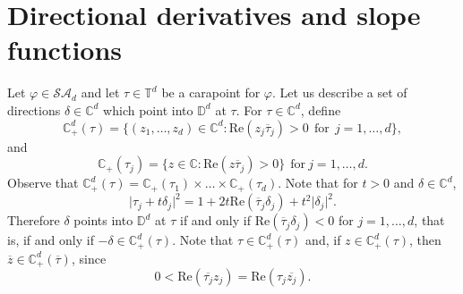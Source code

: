 \documentclass[11pt, reqno]{amsart}
\newcommand\1{\boldsymbol {1}}
\numberwithin{equation}{section}
\begin{document}
\section{Directional derivatives and slope functions}\label{directional_der}

Let $\varphi\in\mathcal{SA}_{d}$ and let $\tau\in\mathbb{T}^{d}$ be a carapoint for $\varphi$. Let us describe a set of directions $\delta\in\mathbb{C}^{d}$ which  point into $\mathbb{D}^{d}$ at $\tau$.
For $\tau\in\mathbb{C}^{d}$, define
$$\mathbb{C}_{+}^{d}(\tau) = \big\{( z_{1},\hdots, z_{d})\in\mathbb{C}^{d} : \mathrm{Re}( z_{j}\overline{\tau}_{j})>0~~\text{for}~~j=1,\hdots,d\big\},$$
and 
$$\mathbb{C}_{+}(\tau_{j}) = \big\{ z\in\mathbb{C} : \mathrm{Re}(z\overline{\tau}_{j})>0\big\}~~\text{for}~j=1,\hdots,d.$$
Observe that $\mathbb{C}^{d}_{+}(\tau) = \mathbb{C}_{+}(\tau_{1})\times \hdots \times\mathbb{C}_{+}(\tau_{d})$. Note that for $t>0$ and $\delta\in\mathbb{C}^{d}$,
$$\lvert \tau_{j} + t\delta_{j}\rvert^{2} = 1+2t\mathrm{Re}(\overline{\tau}_{j}\delta_{j})+t^{2}\lvert \delta_{j}\rvert^{2}.$$
Therefore $\delta$ points into $\mathbb{D}^{d}$ at $\tau$ if and only if $\mathrm{Re}(\overline{\tau}_{j}\delta_{j})<0$ for $j=1,\hdots,d$, that is, if and only if $-\delta \in\mathbb{C}^{d}_{+}(\tau)$. Note that $\tau\in\mathbb{C}_{+}^{d}(\tau)$ and, if $ z\in\mathbb{C}_{+}^{d}(\tau)$, then $ \overline{z}\in\mathbb{C}^{d}_{+}(\overline{\tau})$, since
$$0<\mathrm{Re}(\overline{\tau_{j}} z_{j})=\mathrm{Re}(\tau_{j}\overline{ z_{j}}).$$ 
\end{document}
